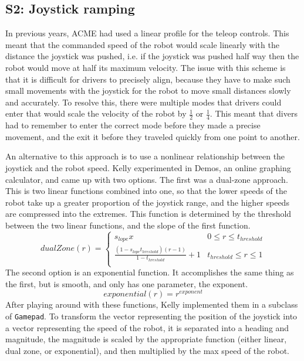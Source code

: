\documentclass{article}
\begin{document}
\subsection{S2: Joystick ramping}

In previous years, ACME had used a linear profile for the teleop controls. This meant that the commanded speed of the robot would scale linearly with the distance the joystick was pushed, i.e. if the joystick was pushed half way then the robot would move at half its maximum velocity. The issue with this scheme is that it is difficult for drivers to precisely align, because they have to make such small movements with the joystick for the robot to move small distances slowly and accurately. To resolve this, there were multiple modes that drivers could enter that would scale the velocity of the robot by $\frac{1}{2}$ or $\frac{1}{4}$. This meant that divers had to remember to enter the correct mode before they made a precise movement, and the exit it before they traveled quickly from one point to another. 

An alternative to this approach is to use a nonlinear relationship between the joystick and the robot speed. Kelly experimented in Demos, an online graphing calculator, and came up with two options. The first was a dual-zone approach. This is two linear functions combined into one, so that the lower speeds of the robot take up a greater proportion of the joystick range, and the higher speeds are compressed into the extremes. This function is determined by the threshold between the two linear functions, and the slope of the first function.
\begin{equation}
dualZone(r) = 
\begin{cases} 
      s_{lope}x & 0 \leq r \leq t_{hreshold}\\
      \frac{(1-s_{lope}t_{hreshold})(r-1)}{1-t_{hreshold}} +1& t_{hreshold} \leq r \leq 1 \\
  \end{cases}
\end{equation}
The second option is an exponential function. It accomplishes the same thing as the first, but is smooth, and only has one parameter, the exponent. 
\begin{equation}
    exponential(r) = r^{exponent}
\end{equation}
After playing around with these functions, Kelly implemented them in a subclass of \texttt{Gamepad}. To transform the vector representing the position of the joystick into a vector representing the speed of the robot, it is separated into a heading and magnitude, the magnitude is scaled by the appropriate function (either linear, dual zone, or exponential), and then multiplied by the max speed of the robot. 
\end{document}
